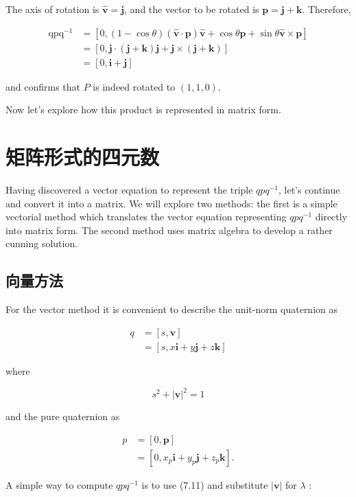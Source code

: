The axis of rotation is $\hat{\mathbf{v}}=\mathbf{j}$, and the vector to be rotated is $\mathbf{p}=\mathbf{j}+\mathbf{k}$. Therefore,

$$
\begin{aligned}
\operatorname{qpq}^{-1} & =[0,(1-\cos \theta)(\hat{\mathbf{v}} \cdot \mathbf{p}) \hat{\mathbf{v}}+\cos \theta \mathbf{p}+\sin \theta \hat{\mathbf{v}} \times \mathbf{p}] \\
& =[0, \mathbf{j} \cdot(\mathbf{j}+\mathbf{k}) \mathbf{j}+\mathbf{j} \times(\mathbf{j}+\mathbf{k})] \\
& =[0, \mathbf{i}+\mathbf{j}]
\end{aligned}
$$

and confirms that $P$ is indeed rotated to $(1,1,0)$.

Now let's explore how this product is represented in matrix form.

\section{矩阵形式的四元数}
Having discovered a vector equation to represent the triple $q p q^{-1}$, let's continue and convert it into a matrix. We will explore two methods: the first is a simple vectorial method which translates the vector equation representing $q p q^{-1}$ directly into matrix form. The second method uses matrix algebra to develop a rather cunning solution.

\subsection{向量方法}
For the vector method it is convenient to describe the unit-norm quaternion as

$$
\begin{aligned}
q & =[s, \mathbf{v}] \\
& =[s, x \mathbf{i}+y \mathbf{j}+z \mathbf{k}]
\end{aligned}
$$

where

$$
s^{2}+|\mathbf{v}|^{2}=1
$$

and the pure quaternion as

$$
\begin{aligned}
p & =[0, \mathbf{p}] \\
& =\left[0, x_{p} \mathbf{i}+y_{p} \mathbf{j}+z_{p} \mathbf{k}\right] .
\end{aligned}
$$

A simple way to compute $q p q^{-1}$ is to use (7.11) and substitute $|\mathbf{v}|$ for $\lambda$ :

